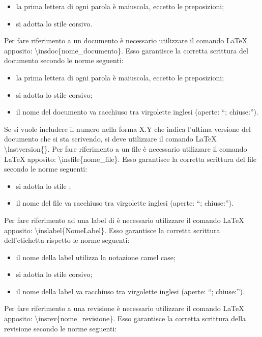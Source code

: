						\begin{itemize}
							\item la prima lettera di ogni parola è maiuscola, eccetto le preposizioni;
							\item si adotta lo stile corsivo.
						\end{itemize}
						Per fare riferimento a un documento è necessario utilizzare il comando \LaTeX{} apposito: \textbackslash insdoc\{nome\_documento\}. Esso garantisce la corretta scrittura del documento secondo le norme seguenti:
						\begin{itemize}
							\item la prima lettera di ogni parola è maiuscola, eccetto le preposizioni;
							\item si adotta lo stile corsivo;
							\item il nome del documento va racchiuso tra virgolette inglesi (aperte: “; chiuse:”).
						\end{itemize}
						Se si vuole includere il numero nella forma X.Y che indica l’ultima versione del documento che si sta scrivendo, si deve utilizzare il comando \LaTeX{} \textbackslash lastversion\{\}.
						Per fare riferimento a un file è necessario utilizzare il comando \LaTeX{} apposito: \textbackslash insfile\{nome\_file\}. Esso garantisce la corretta scrittura del file secondo le norme seguenti:
						\begin{itemize}
							\item si adotta lo stile ;
							\item il nome del file va racchiuso tra virgolette inglesi (aperte: “; chiuse:”).
						\end{itemize}
					 \label{sec:sintassiissue}
						Per fare riferimento ad una label di  è necessario utilizzare il comando \LaTeX{} apposito: \textbackslash inslabel\{NomeLabel\}. Esso garantisce la corretta scrittura dell'etichetta rispetto le norme seguenti:
						\begin{itemize}
							\item il nome della label utilizza la notazione camel case;
							\item si adotta lo stile corsivo;
							\item il nome della label va racchiuso tra virgolette inglesi (aperte: “; chiuse:”).
						\end{itemize}
						Per fare riferimento a una revisione è necessario utilizzare il comando \LaTeX{} apposito: \textbackslash insrev\{nome\_revisione\}. Esso garantisce la corretta scrittura della revisione secondo le norme seguenti:
